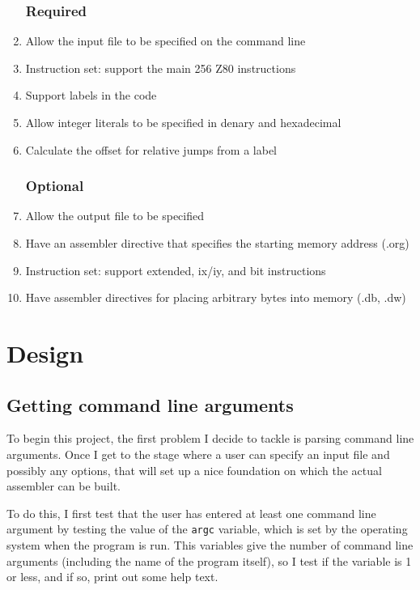 \documentclass[a4paper]{report}
\begin{document}
\begin{enumerate}

\subsection{Required}

	\item \label{req_inputFile}
		Allow the input file to be specified on the command line
	\item \label{req_supportInstructions}
		Instruction set: support the main 256 Z80 instructions
	\item \label{req_doLabels}
		Support labels in the code
	\item \label{req_supportLiterals}
		Allow integer literals to be specified in denary and hexadecimal
	\item \label{req_calcOffset}
		Calculate the offset for relative jumps from a label
\subsection{Optional}

	\item Allow the output file to be specified
	\item Have an assembler directive that specifies the starting memory address
		(.org)
	\item Instruction set: support extended, ix/iy, and bit instructions
	\item Have assembler directives for placing arbitrary bytes into memory
		(.db, .dw)

\end{enumerate}



\chapter{Design}

\section{Getting command line arguments}

To begin this project, the first problem I decide to tackle is parsing command
line arguments. Once I get to the stage where a user can specify an input file
and possibly any options, that will set up a nice foundation on which the actual
assembler can be built.

To do this, I first test that the user has entered at least one command line
argument by testing the value of the \texttt{argc} variable, which is set
by the operating system when the program is run. This variables give the number
of command line arguments (including the name of the program itself), so I test
if the variable is 1 or less, and if so, print out some help text.
\end{document}
